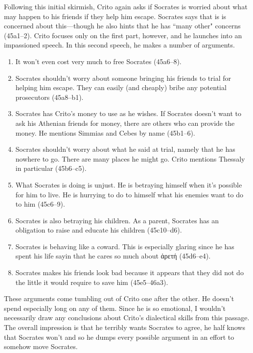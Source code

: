\documentclass[12pt,letterpaper]{article}
\begin{document}
Following this initial skirmish, Crito again asks if Socrates is worried about what may happen to his friends if they help him escape. Socrates says that is is concerned about this---though he also hints that he has ``many other" concerns (45a1--2). Crito focuses only on the first part, however, and he launches into an impassioned speech. In this second speech, he makes a number of arguments.
\begin{enumerate}

    \item It won't even cost very much to free Socrates (45a6--8).

    \item Socrates shouldn't worry about someone bringing his friends to trial for helping him escape. They can easily (and cheaply) bribe any potential prosecutors (45a8--b1).

    \item Socrates has Crito's money to use as he wishes. If Socrates doesn't want to ask his Athenian friends for money, there are others who can provide the money. He mentions Simmias and Cebes by name (45b1--6).

    \item Socrates shouldn't worry about what he said at trial, namely that he has nowhere to go. There are many places he might go. Crito mentions Thessaly in particular (45b6--c5).

    \item What Socrates is doing is unjust. He is betraying himself when it's possible for him to live. He is hurrying to do to himself what his enemies want to do to him (45c6--9).

    \item Socrates is also betraying his children. As a parent, Socrates has an obligation to raise and educate his children (45c10--d6).

    \item Socrates is behaving like a coward. This is especially glaring since he has spent his life sayin that he cares so much about \textgreek{ἀρετή} (45d6--e4).

    \item Socrates makes his friends look bad because it appears that they did not do the little it would require to save him (45e5--46a3).

\end{enumerate}

These arguments come tumbling out of Crito one after the other. He doesn't spend especially long on any of them. Since he is so emotional, I wouldn't necessarily draw any conclusions about Crito's dialectical skills from this passage. The overall impression is that he terribly wants Socrates to agree, he half knows that Socrates won't and so he dumps every possible argument in an effort to somehow move Socrates.
\end{document}
